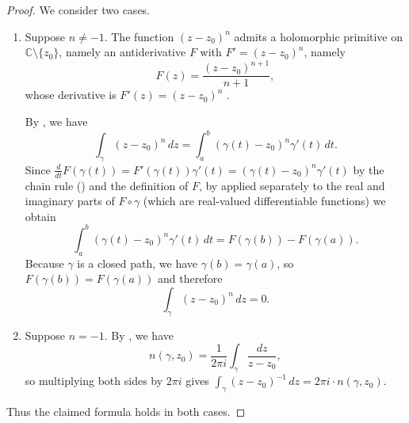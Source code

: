 \begin{proof}
    We consider two cases.

    \begin{enumerate}
        \item Suppose $n \neq -1$. The function $(z - z_0)^n$ admits a holomorphic primitive on $\mathbb{C} \setminus \{z_0\}$, namely an antiderivative $F$ with $F' = (z-z_0)^n$, namely
        $$F(z) = \frac{(z - z_0)^{n+1}}{n+1},$$
        whose derivative is $F'(z) = (z - z_0)^n$
        .

        By , we have
        $$\int_{\gamma} (z - z_0)^n \, dz = \int_a^b (\gamma(t) - z_0)^n \gamma'(t) \, dt.$$
        Since $\frac{d}{dt} F(\gamma(t)) = F'(\gamma(t))\gamma'(t) = (\gamma(t) - z_0)^n \gamma'(t)$ by the chain rule () and the definition of $F$, by  applied separately to the real and imaginary parts of $F \circ \gamma$ (which are real-valued differentiable functions) we obtain
        $$\int_a^b (\gamma(t) - z_0)^n \gamma'(t) \, dt = F(\gamma(b)) - F(\gamma(a)).$$
        Because $\gamma$ is a closed path, we have $\gamma(b) = \gamma(a)$, so $F(\gamma(b)) = F(\gamma(a))$ and therefore
        $$\int_{\gamma} (z - z_0)^n \, dz = 0.$$

        \item Suppose $n = -1$. By , we have
        $$n(\gamma, z_0) = \frac{1}{2\pi i} \int_{\gamma} \frac{dz}{z - z_0},$$
        so multiplying both sides by $2\pi i$ gives $\int_{\gamma} (z - z_0)^{-1} \, dz = 2\pi i \cdot n(\gamma, z_0)$.
    \end{enumerate}

    Thus the claimed formula holds in both cases.
\end{proof}